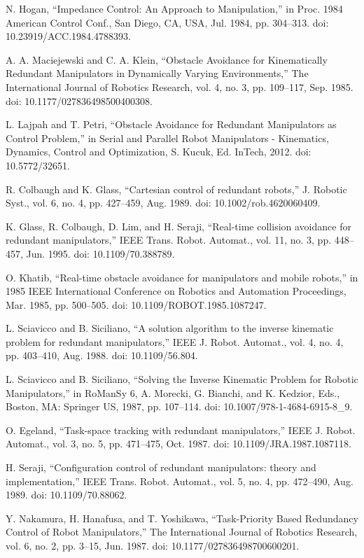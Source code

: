 \documentclass[letterpaper, 10 pt, conference]{ieeeconf}  %
\begin{document}
\begin{thebibliography}{99}
 N. Hogan, “Impedance Control: An Approach to Manipulation,” in Proc. 1984 American Control Conf., San Diego, CA, USA, Jul. 1984, pp. 304–313. doi: 10.23919/ACC.1984.4788393.

 A. A. Maciejewski and C. A. Klein, “Obstacle Avoidance for Kinematically Redundant Manipulators in Dynamically Varying Environments,” The International Journal of Robotics Research, vol. 4, no. 3, pp. 109–117, Sep. 1985. doi: 10.1177/027836498500400308.

 L. Lajpah and T. Petri, “Obstacle Avoidance for Redundant Manipulators as Control Problem,” in Serial and Parallel Robot Manipulators - Kinematics, Dynamics, Control and Optimization, S. Kucuk, Ed. InTech, 2012. doi: 10.5772/32651.

 R. Colbaugh and K. Glass, “Cartesian control of redundant robots,” J. Robotic Syst., vol. 6, no. 4, pp. 427–459, Aug. 1989. doi: 10.1002/rob.4620060409.

 K. Glass, R. Colbaugh, D. Lim, and H. Seraji, “Real-time collision avoidance for redundant manipulators,” IEEE Trans. Robot. Automat., vol. 11, no. 3, pp. 448–457, Jun. 1995. doi: 10.1109/70.388789.

 O. Khatib, “Real-time obstacle avoidance for manipulators and mobile robots,” in 1985 IEEE International Conference on Robotics and Automation Proceedings, Mar. 1985, pp. 500–505. doi: 10.1109/ROBOT.1985.1087247.

 L. Sciavicco and B. Siciliano, “A solution algorithm to the inverse kinematic problem for redundant manipulators,” IEEE J. Robot. Automat., vol. 4, no. 4, pp. 403–410, Aug. 1988. doi: 10.1109/56.804.

 L. Sciavicco and B. Siciliano, “Solving the Inverse Kinematic Problem for Robotic Manipulators,” in RoManSy 6, A. Morecki, G. Bianchi, and K. Kedzior, Eds., Boston, MA: Springer US, 1987, pp. 107–114. doi: 10.1007/978-1-4684-6915-8\_9.

 O. Egeland, “Task-space tracking with redundant manipulators,” IEEE J. Robot. Automat., vol. 3, no. 5, pp. 471–475, Oct. 1987. doi: 10.1109/JRA.1987.1087118.

 H. Seraji, “Configuration control of redundant manipulators: theory and implementation,” IEEE Trans. Robot. Automat., vol. 5, no. 4, pp. 472–490, Aug. 1989. doi: 10.1109/70.88062.

 Y. Nakamura, H. Hanafusa, and T. Yoshikawa, “Task-Priority Based Redundancy Control of Robot Manipulators,” The International Journal of Robotics Research, vol. 6, no. 2, pp. 3–15, Jun. 1987. doi: 10.1177/027836498700600201.


\end{thebibliography}
\end{document}
